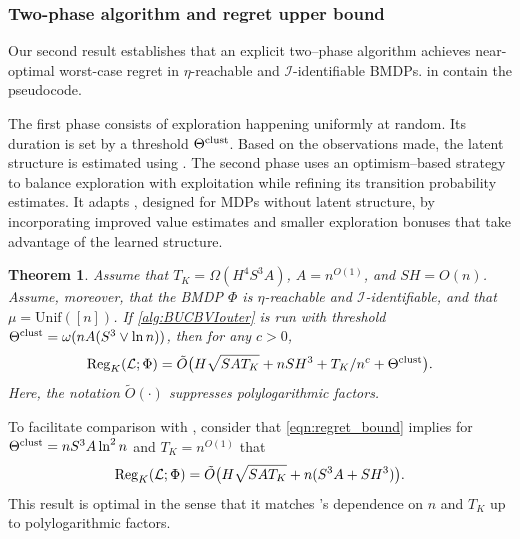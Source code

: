 \documentclass[11pt]{article}
\newcommand{\mcI}{\mathcal{I}}
\newcommand{\mcL}{\mathcal{L}}
\newcommand{\clust}{\textnormal{clust}}
\newcommand{\reg}{\textnormal{Reg}}
\newtheorem{theorem}{Theorem}[section]
\theoremstyle{definition}
\theoremstyle{definition}
\begin{document}
\subsubsection{Two-phase algorithm and regret upper bound}
\label{sec:main_results:regret_upper_bound}

Our second result establishes that an explicit two--phase algorithm achieves near-optimal worst-case regret in $\eta$-reachable and $\mcI$-identifiable \glspl{BMDP}.
 in  contain the pseudocode.

The first phase consists of exploration happening uniformly at random.
Its duration is set by a threshold $\Theta^{\clust}$.
Based on the observations made, the latent structure is estimated using \cite[Algorithms 1 and 2]{Jedra:2022}.
The second phase uses an optimism--based strategy to balance exploration with exploitation while refining its transition probability estimates.
It adapts \cite[Algorithms 1 and 2]{UCRLVI}, designed for \glspl{MDP} without latent structure, by incorporating improved value estimates and smaller exploration bonuses that take advantage of the learned structure.

\begin{theorem}
	\label{thm:BUCBbd}
	Assume that $T_K= \Omega(H^4S^3A)$, $A = n^{O(1)}$, and $SH=O(n)$.
	Assume, moreover, that the \gls{BMDP} $\Phi$ is $\eta$-reachable and $\mcI$-identifiable, and that $\mu=\mathrm{Unif}([n])$.
	If \cref{alg:BUCBVIouter} is run with threshold $\Theta^{\clust} = \omega(nA(S^3 \vee \ln n))$, then for any $c>0$,
	\begin{equation}
		\label{eqn:regret_bound}
		\textnormal{Reg}_K(\mcL;\Phi)
		=
		\tilde{O}\bigl(
		H\sqrt{SAT_K}
		+
		nSH^3
		+
		T_K/n^c
		+
		\Theta^{\clust}
		\bigr)
		.
	\end{equation}
	Here, the notation $\tilde{O}(\cdot)$ suppresses polylogarithmic factors.
\end{theorem}

To facilitate comparison with , consider that \eqref{eqn:regret_bound} implies for $\Theta^{\clust} = nS^3A \ln^2 n$ and $T_K=n^{O(1)}$ that
\begin{equation}
	\label{eqn:simplified_regret_upper_bound}
	\reg_K(\mcL;\Phi)
	=
	\tilde{O}
	\bigl(
	H\sqrt{SAT_K}+n(S^3A+SH^3)
	\bigr)
	.
\end{equation}
This result is optimal in the sense that it matches 's dependence on $n$ and $T_K$ up to polylogarithmic factors.
\end{document}
